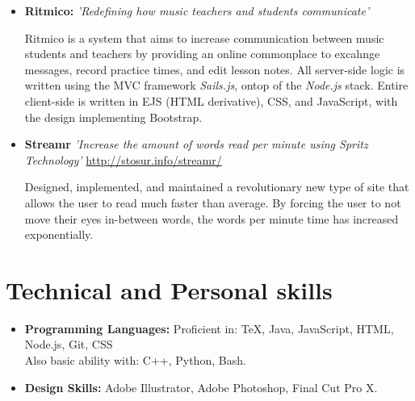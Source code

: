 \documentclass[11pt,a4paper,roman]{moderncv}        %
\begin{document}
\begin{itemize}

\item{\textbf{Ritmico:} \textit{'Redefining how music teachers and students communicate'}

\vspace{3pt}

\small{Ritmico is a system that aims to increase communication between music students and teachers by providing an online commonplace to excahnge messages, record practice times, and edit lesson notes.  All server-side logic is written using the MVC framework \textit{Sails.js}, ontop of the \textit{Node.js} stack.  Entire client-side is written in EJS (HTML derivative), CSS, and JavaScript, with the design implementing Bootstrap.}}

\vspace{6pt}

\item{\textbf{Streamr} \textit{'Increase the amount of words read per minute using Spritz Technology'}  \url{http://stosur.info/streamr/}

\vspace{3pt}

\small{Designed, implemented, and maintained a revolutionary new type of site that allows the user to read much faster than average. By forcing the user to not move their eyes in-between words, the words per minute time has increased exponentially.}}

\vspace{6pt}

\end{itemize}

\section{Technical and Personal skills}

\vspace{6pt}

\begin{itemize}

\item \textbf{Programming Languages:} Proficient in: TeX, Java, JavaScript, HTML, Node.js, Git, CSS \\ Also basic ability with: C++, Python, Bash.

\vspace{6pt}

\item \textbf{Design Skills:} Adobe Illustrator, Adobe Photoshop, Final Cut Pro X.

\end{itemize}
\end{document}
